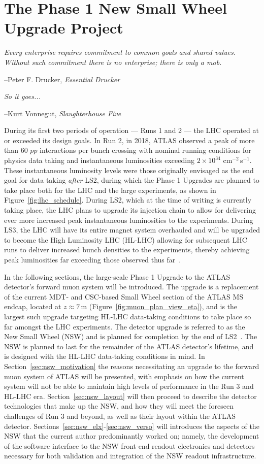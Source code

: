 \chapter{The Phase 1 New Small Wheel Upgrade Project}
\label{chap:nsw}

\epigraph{\textit{Every enterprise requires commitment to common goals and shared values. Without such commitment there is no enterprise; there is only a mob.}}{--Peter F. Drucker, \textit{Essential Drucker}}
\epigraph{\textit{So it goes...}}{--Kurt Vonnegut, \textit{Slaughterhouse Five}}

During its first two periods of operation --- Runs 1 and 2 --- the LHC operated
at or exceeded its design goals.
In Run 2, in 2018, ATLAS observed a peak of more than 60 $pp$ interactions per bunch crossing with nominal running conditions for physics data taking
and instantaneous luminosities exceeding $2\times 10^{34}$ cm$^{-2}$\,s$^{-1}$.
These instantaneous luminosity levels were those originally envisaged as the end goal for data taking \textit{after} LS2,
during which the Phase 1 Upgrades are planned to take place both for the LHC and the large experiments, as shown in Figure~\ref{fig:lhc_schedule}.
During LS2, which at the time of writing is currently taking place, the LHC plans to upgrade its injection chain to allow for delivering ever
more increased peak instantaneous luminosities to the experiments.
During LS3, the LHC will have its entire magnet system overhauled and will be upgraded to become the
High Luminosity LHC (HL-LHC) allowing for subsequent LHC runs to deliver increased bunch densities 
to the experiments, thereby achieving peak luminosities far exceeding those observed thus far~\cite{HLLHCPDR}.

In the following sections, the large-scale Phase 1 Upgrade to the ATLAS detector's forward muon system
will be introduced.
The upgrade is a replacement of the current MDT- and CSC-based Small Wheel section of the ATLAS MS endcap, located at $z \approx 7$\,m (Figure~\ref{fig:muon_plan_view_eta}),
and is the largest such upgrade targeting HL-LHC data-taking conditions to take place so far amongst the LHC experiments.
The detector upgrade is referred to as the New Small Wheel (NSW) and is planned for completion by
the end of LS2~\cite{NSWTDR}.
The NSW is planned to last for the remainder of the ATLAS detector's lifetime, and is designed with the
HL-LHC data-taking conditions in mind.
In Section~\ref{sec:nsw_motivation} the reasons necessitating an upgrade to the forward muon system
of ATLAS will be presented, with emphasis on how the current system will not be able to maintain high
levels of performance in the Run 3 and HL-LHC era.
Section~\ref{sec:nsw_layout} will then proceed to describe the detector technologies that make up
the NSW, and how they will meet the foreseen challenges of Run 3 and beyond, as well as their layout
within the ATLAS detector.
Sections~\ref{sec:nsw_elx}-\ref{sec:nsw_verso} will introduces the aspects of the NSW that the
current author predominantly worked on; namely, the development of the software interface to the NSW front-end readout
electronics and detectors necessary for both validation and integration of the NSW readout infrastructure.

